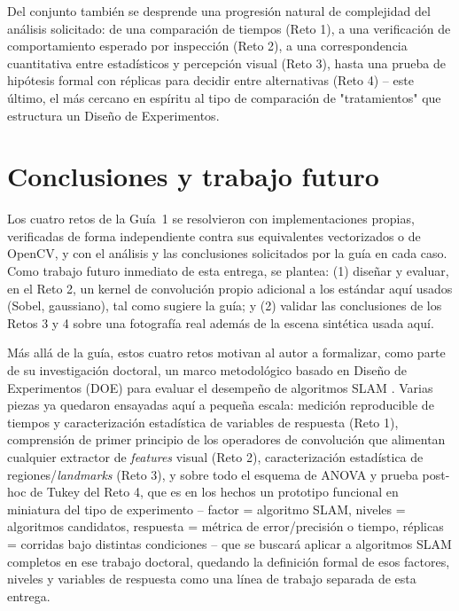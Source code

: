 \documentclass[11pt]{article}
\begin{document}
Del conjunto también se desprende una progresión natural de complejidad
del análisis solicitado: de una comparación de tiempos (Reto 1), a una
verificación de comportamiento esperado por inspección (Reto 2), a una
correspondencia cuantitativa entre estadísticos y percepción visual
(Reto 3), hasta una prueba de hipótesis formal con réplicas para decidir
entre alternativas (Reto 4) -- este último, el más cercano en espíritu al
tipo de comparación de "tratamientos" que estructura un Diseño de
Experimentos.

\section{Conclusiones y trabajo futuro}
\label{sec:conclusiones}
Los cuatro retos de la Guía~1 se resolvieron con implementaciones propias,
verificadas de forma independiente contra sus equivalentes vectorizados o
de OpenCV, y con el análisis y las conclusiones solicitados por la guía en
cada caso. Como trabajo futuro inmediato de esta entrega, se plantea: (1)
diseñar y evaluar, en el Reto 2, un kernel de convolución propio adicional
a los estándar aquí usados (Sobel, gaussiano), tal como sugiere la guía; y
(2) validar las conclusiones de los Retos 3 y 4 sobre una fotografía real
además de la escena sintética usada aquí.

Más allá de la guía, estos cuatro retos motivan al autor a formalizar, como
parte de su investigación doctoral, un marco metodológico basado en Diseño
de Experimentos (DOE) \citep{montgomery2019design} para evaluar el
desempeño de algoritmos SLAM \citep{cadena2016past,murartal2017orbslam2}.
Varias piezas ya quedaron ensayadas aquí a pequeña escala: medición
reproducible de tiempos y caracterización estadística de variables de
respuesta (Reto 1), comprensión de primer principio de los operadores de
convolución que alimentan cualquier extractor de \emph{features} visual
(Reto 2), caracterización estadística de regiones/\emph{landmarks}
(Reto 3), y sobre todo el esquema de ANOVA y prueba post-hoc de Tukey del
Reto 4, que es en los hechos un prototipo funcional en miniatura del tipo
de experimento -- factor = algoritmo SLAM, niveles = algoritmos candidatos,
respuesta = métrica de error/precisión o tiempo, réplicas = corridas bajo
distintas condiciones -- que se buscará aplicar a algoritmos SLAM
completos en ese trabajo doctoral, quedando la definición formal de esos
factores, niveles y variables de respuesta como una línea de trabajo
separada de esta entrega.



\end{document}
